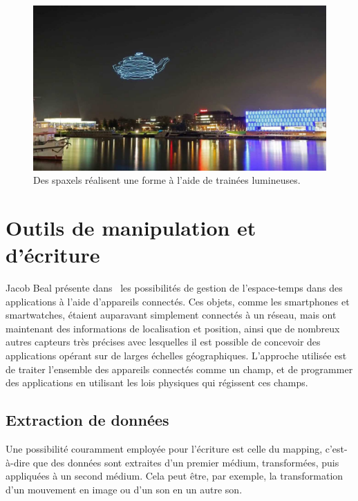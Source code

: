 \documentclass[french,12pt]{article}
\begin{document}
\begin{figure}[h]
    \centering
    \includegraphics[scale=0.25]{images/spaxels.jpg}
    \caption{Des spaxels réalisent une forme à l'aide de trainées lumineuses.}
    \label{fig.spaxels}
\end{figure}

\section{Outils de manipulation et d'écriture}

Jacob Beal présente dans~\cite{beal_spacetime_2015} les possibilités de gestion de l'espace-temps dans des applications à l'aide d'appareils connectés. Ces objets, comme les smartphones et smartwatches, étaient auparavant simplement connectés à un réseau, mais ont maintenant des informations de localisation et position, ainsi que de nombreux autres capteurs très précises avec lesquelles il est possible de concevoir des applications opérant sur de larges échelles géographiques. L'approche utilisée est de traiter l'ensemble des appareils connectés comme un champ, et de programmer des applications en utilisant les lois physiques qui régissent ces champs.

\subsection{Extraction de données}
Une possibilité couramment employée pour l'écriture est celle du mapping, c'est-à-dire que des données sont extraites d'un premier médium, transformées, puis appliquées à un second médium. Cela peut être, par exemple, la transformation d'un mouvement en image ou d'un son en un autre son.
\end{document}
